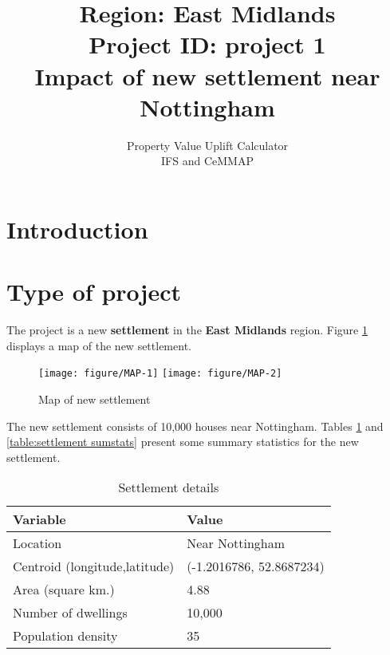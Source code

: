 \documentclass{article}\usepackage[]{graphicx}\usepackage[]{color}
\title{Region:   East Midlands \\
       Project ID:   project 1 \\
       Impact of new settlement near Nottingham }
\author{Property Value Uplift Calculator \\
        IFS and CeMMAP}
\date{}
\newenvironment{knitrout}{}{} %
\begin{document}
\maketitle

\section{Introduction}

\section{Type of project}
The project is a new \textbf{settlement} in the 
\textbf{East Midlands} region. Figure \ref{fig:MAP} displays a map of the new settlement. 

\begin{knitrout}\scriptsize
{}\color{fgcolor}\begin{figure}[H]
\texttt{[image: figure/MAP-1]} 
\texttt{[image: figure/MAP-2]} \caption[Map of new settlement]{Map of new settlement}\label{fig:MAP}
\end{figure}


\end{knitrout}

The new settlement consists of 10,000 houses near Nottingham. Tables \ref{table:settlement} and \ref{table:settlement sumstats} present some summary statistics for the new settlement.

\begin{table}[H]
\caption{Settlement details}\label{table:settlement}
\begin{center}
\begin{tabular}{ll}
\hline \hline
Variable & Value \\
\hline
Location & Near Nottingham \\
Centroid (longitude,latitude) & (-1.2016786, 52.8687234) \\
Area (square km.) & 4.88  \\
Number of dwellings & 10,000 \\
Population density & 35 \\
\hline
\end{tabular}
\end{center}
\end{table}
\end{document}
